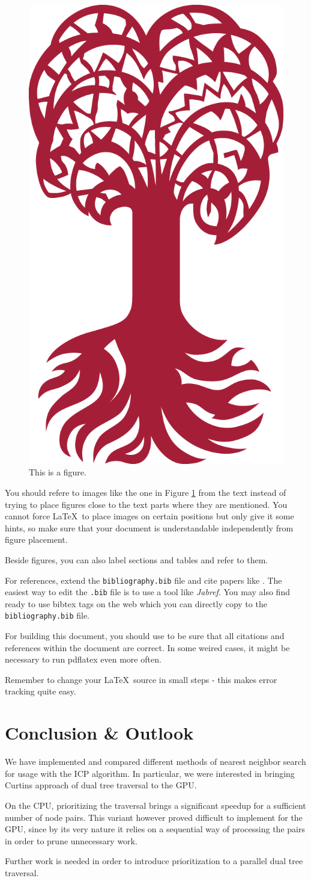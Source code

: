 \documentclass{utue} %
\begin{document}
\begin{figure}[h!]
  \centering
  \includegraphics[width=.4\columnwidth]{images/Tuebingen_CorporateElements/UT_BM_Rot_RGB_tr_01.png}
  \caption{This is a figure.}
  \label{fig:figure1}
\end{figure}

You should refere to images like the one in Figure \ref{fig:figure1} from the text instead of trying to place figures close to the text parts where they are mentioned. You cannot force \LaTeX~to place images on certain positions but only give it some hints, so make sure that your document is understandable independently from figure placement.

Beside figures, you can also label sections and tables and refer to them.

For references, extend the \texttt{bibliography.bib} file and cite papers like \cite{Miller1995}. The easiest way to edit the \texttt{.bib} file is to use a tool like \emph{Jabref}. You may also find ready to use bibtex tags on the web which you can directly copy to the \texttt{bibliography.bib} file.

For building this document, you should use 
to be sure that all citations and references within the document are correct. In some weired cases, it might be necessary to run pdflatex even more often.

Remember to change your \LaTeX~source in small steps - this makes error tracking quite easy.
\section{Conclusion \& Outlook}
We have implemented and compared different methods of nearest neighbor search for usage with the ICP algorithm. In particular, we were interested in bringing Curtins approach\cite{improving} of dual tree traversal to the GPU.

On the CPU, prioritizing the traversal brings a significant speedup for a sufficient number of node pairs. This variant however proved difficult to implement for the GPU, since by its very nature it relies on a sequential way of processing the pairs in order to prune unnecessary work.

Further work is needed in order to introduce prioritization to a parallel dual tree traversal.



\end{document}
